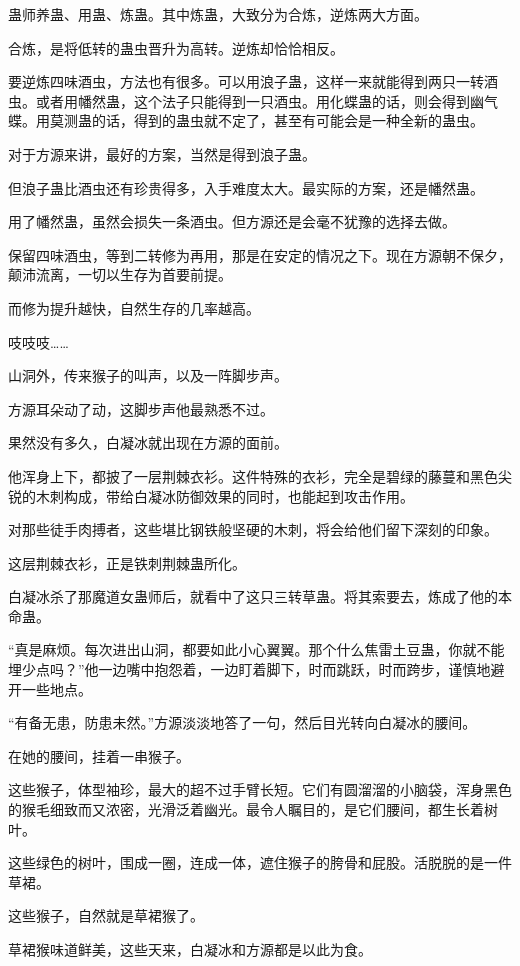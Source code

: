 \begin{this_body}
蛊师养蛊、用蛊、炼蛊。其中炼蛊，大致分为合炼，逆炼两大方面。

合炼，是将低转的蛊虫晋升为高转。逆炼却恰恰相反。

要逆炼四味酒虫，方法也有很多。可以用浪子蛊，这样一来就能得到两只一转酒虫。或者用幡然蛊，这个法子只能得到一只酒虫。用化蝶蛊的话，则会得到幽气蝶。用莫测蛊的话，得到的蛊虫就不定了，甚至有可能会是一种全新的蛊虫。

对于方源来讲，最好的方案，当然是得到浪子蛊。

但浪子蛊比酒虫还有珍贵得多，入手难度太大。最实际的方案，还是幡然蛊。

用了幡然蛊，虽然会损失一条酒虫。但方源还是会毫不犹豫的选择去做。

保留四味酒虫，等到二转修为再用，那是在安定的情况之下。现在方源朝不保夕，颠沛流离，一切以生存为首要前提。

而修为提升越快，自然生存的几率越高。

吱吱吱……

山洞外，传来猴子的叫声，以及一阵脚步声。

方源耳朵动了动，这脚步声他最熟悉不过。

果然没有多久，白凝冰就出现在方源的面前。

他浑身上下，都披了一层荆棘衣衫。这件特殊的衣衫，完全是碧绿的藤蔓和黑色尖锐的木刺构成，带给白凝冰防御效果的同时，也能起到攻击作用。

对那些徒手肉搏者，这些堪比钢铁般坚硬的木刺，将会给他们留下深刻的印象。

这层荆棘衣衫，正是铁刺荆棘蛊所化。

白凝冰杀了那魔道女蛊师后，就看中了这只三转草蛊。将其索要去，炼成了他的本命蛊。

“真是麻烦。每次进出山洞，都要如此小心翼翼。那个什么焦雷土豆蛊，你就不能埋少点吗？”他一边嘴中抱怨着，一边盯着脚下，时而跳跃，时而跨步，谨慎地避开一些地点。

“有备无患，防患未然。”方源淡淡地答了一句，然后目光转向白凝冰的腰间。

在她的腰间，挂着一串猴子。

这些猴子，体型袖珍，最大的超不过手臂长短。它们有圆溜溜的小脑袋，浑身黑色的猴毛细致而又浓密，光滑泛着幽光。最令人瞩目的，是它们腰间，都生长着树叶。

这些绿色的树叶，围成一圈，连成一体，遮住猴子的胯骨和屁股。活脱脱的是一件草裙。

这些猴子，自然就是草裙猴了。

草裙猴味道鲜美，这些天来，白凝冰和方源都是以此为食。


\end{this_body}
